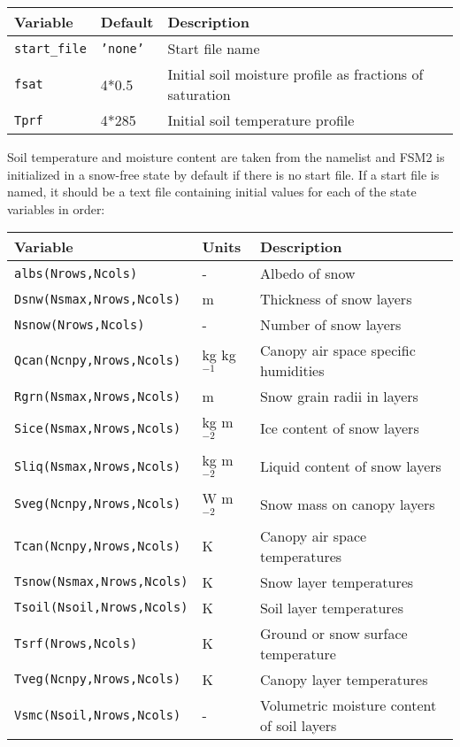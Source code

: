 \documentclass{article}
\begin{document}
\begin{longtable}{|l|l|l|} \hline
Variable          & Default      & Description                                              \\ \hline
{\tt start\_file} & {\tt 'none'} & Start file name                                          \\
{\tt fsat}        & 4*0.5        & Initial soil moisture profile as fractions of saturation \\
{\tt Tprf}        & 4*285        & Initial soil temperature profile                         \\ \hline 
\end{longtable}

Soil temperature and moisture content are taken from the namelist and FSM2 is initialized in a snow-free state by default if there is no start file. If a start file is named, it should be a text file containing initial values for each of the state variables in order:

\begin{longtable}{|l|l|l|}
\hline
Variable & Units & Description \\
\hline
{\tt albs(Nrows,Ncols)}        & -            & Albedo of snow                             \\
{\tt Dsnw(Nsmax,Nrows,Ncols)}  & m            & Thickness of snow layers                   \\
{\tt Nsnow(Nrows,Ncols)}       & -            & Number of snow layers                      \\
{\tt Qcan(Ncnpy,Nrows,Ncols)}  & kg kg$^{-1}$ & Canopy air space specific humidities       \\
{\tt Rgrn(Nsmax,Nrows,Ncols)}  & m            & Snow grain radii in layers                 \\
{\tt Sice(Nsmax,Nrows,Ncols)}  & kg m$^{-2}$  & Ice content of snow layers                 \\
{\tt Sliq(Nsmax,Nrows,Ncols)}  & kg m$^{-2}$  & Liquid content of snow layers              \\
{\tt Sveg(Ncnpy,Nrows,Ncols)}  & W m$^{-2}$   & Snow mass on canopy layers                 \\
{\tt Tcan(Ncnpy,Nrows,Ncols)}  & K            & Canopy air space temperatures              \\
{\tt Tsnow(Nsmax,Nrows,Ncols)} & K            & Snow layer temperatures                    \\
{\tt Tsoil(Nsoil,Nrows,Ncols)} & K            & Soil layer temperatures                    \\
{\tt Tsrf(Nrows,Ncols)}        & K            & Ground or snow surface temperature         \\
{\tt Tveg(Ncnpy,Nrows,Ncols)}  & K            & Canopy layer temperatures                  \\
{\tt Vsmc(Nsoil,Nrows,Ncols)}  & -            & Volumetric moisture content of soil layers \\
\hline 
\end{longtable}
\end{document}
